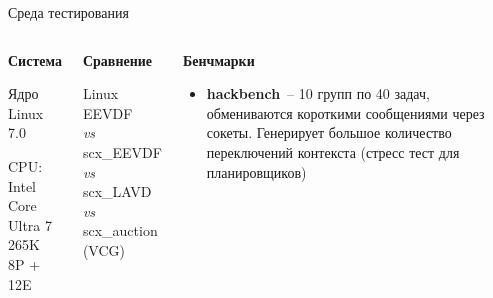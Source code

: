 \documentclass[aspectratio=169]{beamer}
\begin{document}
\begin{frame}{Среда тестирования}
        \begin{columns}[T]
                \begin{shadowbox}
                        \small\textbf{Система}

                        \vspace{0.25em}
                        \footnotesize
                        Ядро Linux 7.0

                        \vspace{0.25em}
                        CPU: Intel Core\\ Ultra 7 265K\\
                        8P + 12E
                \end{shadowbox}

                \begin{shadowbox}
                        \small\textbf{Сравнение}

                        \vspace{0.2em}
                        \footnotesize
                        Linux EEVDF\\
                        \textit{vs}\\
                        scx\_EEVDF\\
                        \textit{vs}\\
                        scx\_LAVD\\
                        \textit{vs}\\
                        scx\_auction (VCG)
                \end{shadowbox}

                \begin{shadowbox}
                        \small\textbf{Бенчмарки}

                        \vspace{0.15cm}
                        \footnotesize
                \begin{itemize}\setlength{\itemsep}{0.15cm}\setlength{\parskip}{0pt}
                                \item \textbf{hackbench}~-- 10 групп по 40
                                        задач, обмениваются короткими
                                        сообщениями через сокеты.
                                        Генерирует большое количество
                                        переключений контекста (стресс тест
                                        для планировщиков)


\end{itemize}
\end{shadowbox}
\end{columns}
\end{frame}
\end{document}
